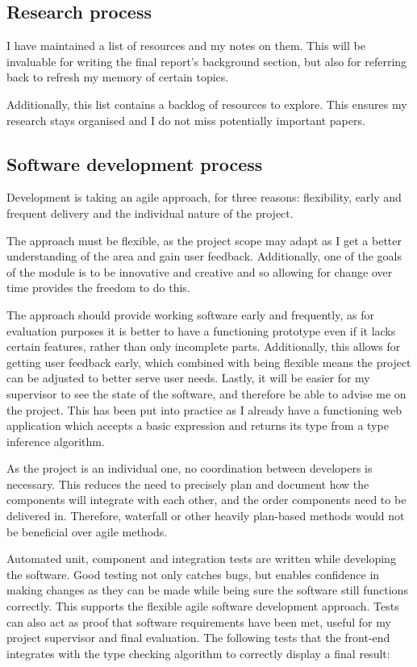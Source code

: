 \documentclass[a4paper,fleqn,12pt]{article}
\begin{document}
\subsection{Research process}\label{id:h.ew85fk610kqt}

I have maintained a list of resources and my notes on them. This will be invaluable for writing the final report’s background section, but also for referring back to refresh my memory of certain topics.

Additionally, this list contains a backlog of resources to explore. This ensures my research stays organised and I do not miss potentially important papers.

\subsection{Software development process}\label{id:h.d99ru3rx4zo}

Development is taking an agile approach, for three reasons: flexibility, early and frequent delivery and the individual nature of the project.

The approach must be flexible, as the project scope may adapt as I get a better understanding of the area and gain user feedback. Additionally, one of the goals of the module is to be innovative and creative and so allowing for change over time provides the freedom to do this.

The approach should provide working software early and frequently, as for evaluation purposes it is better to have a functioning prototype even if it lacks certain features, rather than only incomplete parts. Additionally, this allows for getting user feedback early, which combined with being flexible means the project can be adjusted to better serve user needs. Lastly, it will be easier for my supervisor to see the state of the software, and therefore be able to advise me on the project. This has been put into practice as I already have a functioning web application which accepts a basic expression and returns its type from a type inference algorithm.

As the project is an individual one, no coordination between developers is necessary. This reduces the need to precisely plan and document how the components will integrate with each other, and the order components need to be delivered in. Therefore, waterfall or other heavily plan-based methods would not be beneficial over agile methods.

Automated unit, component and integration tests are written while developing the software. Good testing not only catches bugs, but enables confidence in making changes as they can be made while being sure the software still functions correctly. This supports the flexible agile software development approach. Tests can also act as proof that software requirements have been met, useful for my project supervisor and final evaluation. The following tests that the front-end integrates with the type checking algorithm to correctly display a final result:
\end{document}
